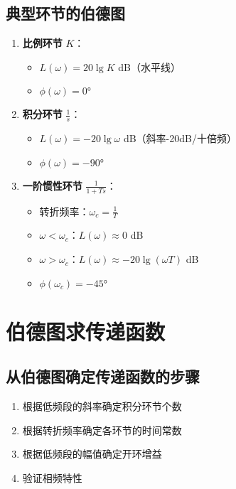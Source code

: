 \documentclass[12pt,a4paper]{article}
\begin{document}
\subsection{典型环节的伯德图}
\begin{enumerate}
    \item \textbf{比例环节} $K$：
    \begin{itemize}
        \item $L(\omega) = 20\lg K$ dB（水平线）
        \item $\phi(\omega) = 0°$
    \end{itemize}
    
    \item \textbf{积分环节} $\frac{1}{s}$：
    \begin{itemize}
        \item $L(\omega) = -20\lg\omega$ dB（斜率-20dB/十倍频）
        \item $\phi(\omega) = -90°$
    \end{itemize}
    
    \item \textbf{一阶惯性环节} $\frac{1}{1+Ts}$：
    \begin{itemize}
        \item 转折频率：$\omega_c = \frac{1}{T}$
        \item $\omega < \omega_c$：$L(\omega) \approx 0$ dB
        \item $\omega > \omega_c$：$L(\omega) \approx -20\lg(\omega T)$ dB
        \item $\phi(\omega_c) = -45°$
    \end{itemize}
\end{enumerate}

\section{伯德图求传递函数}

\subsection{从伯德图确定传递函数的步骤}
\begin{enumerate}
    \item 根据低频段的斜率确定积分环节个数
    \item 根据转折频率确定各环节的时间常数
    \item 根据低频段的幅值确定开环增益
    \item 验证相频特性
\end{enumerate}
\end{document}
